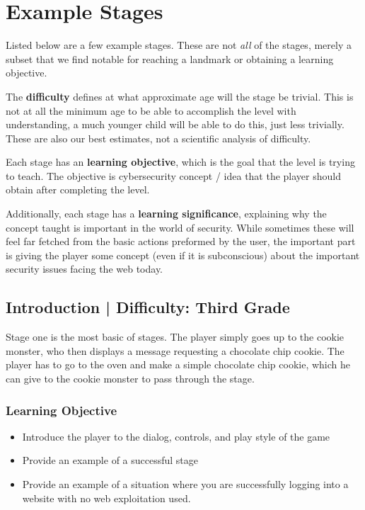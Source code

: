 \documentclass{article}
\begin{document}
\section{Example Stages}

Listed below are a few example stages. These are not \textit{all} of
the stages, merely a subset that we find notable for reaching a
landmark or obtaining a learning objective.

The \textbf{difficulty} defines at what approximate age will the stage
be trivial. This is not at all the minimum age to be able to accomplish
the level with understanding, a much younger child will be able to do
this, just less trivially. These are also our best estimates, not a
scientific analysis of difficulty.

Each stage has an \textbf{learning objective}, which is the goal that
the level is trying to teach. The objective is cybersecurity concept /
idea that the player should obtain after completing the level.

Additionally, each stage has a \textbf{learning significance},
explaining why the concept taught is important in the world of
security. While sometimes these will feel far fetched from the basic
actions preformed by the user, the important part is giving the player
some concept (even if it is subconscious) about the important security
issues facing the web today.

\subsection{Introduction | Difficulty: Third Grade}

Stage one is the most basic of stages. The player simply goes up to
the cookie monster, who then displays a message requesting a chocolate
chip cookie. The player has to go to the oven and make a simple
chocolate chip cookie, which he can give to the cookie monster to pass
through the stage.

\subsubsection{Learning Objective}

\begin{itemize}

  \item Introduce the player to the dialog, controls, and play style of
the game
  \item Provide an example of a successful stage
  \item Provide an example of a situation where you are successfully
logging into a website with no web exploitation used.
\end{itemize}
\end{document}
